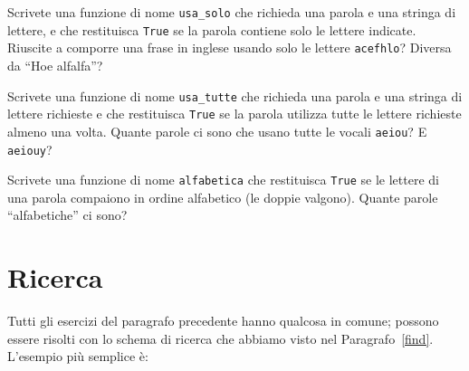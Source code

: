 \documentclass[10pt]{book}
\begin{document}
\vspace{0.2in}
\begin{exercise}

Scrivete una funzione di nome \verb"usa_solo" che richieda una parola e una stringa di lettere, e che restituisca {\tt True} se la parola contiene solo le lettere indicate. Riuscite a comporre una frase in inglese usando solo le lettere
{\tt acefhlo}?  Diversa da ``Hoe alfalfa''?

\end{exercise}

\vspace{0.2in}
\begin{exercise} 

Scrivete una funzione di nome \verb"usa_tutte" che richieda una parola e una stringa di lettere richieste e che restituisca {\tt True} se la parola utilizza tutte le lettere richieste almeno una volta. Quante parole ci sono che usano tutte le vocali {\tt aeiou}?  E {\tt aeiouy}?

\end{exercise}

\vspace{0.2in}
\begin{exercise}

Scrivete una funzione di nome \verb"alfabetica" che restituisca 
{\tt True} se le lettere di una parola compaiono in ordine alfabetico (le doppie valgono). Quante parole ``alfabetiche'' ci sono?

\end{exercise}






\section{Ricerca}

Tutti gli esercizi del paragrafo precedente hanno qualcosa in comune; possono essere risolti con lo schema di ricerca che abbiamo visto nel Paragrafo~\ref{find}.  L'esempio più semplice è:
\end{document}
